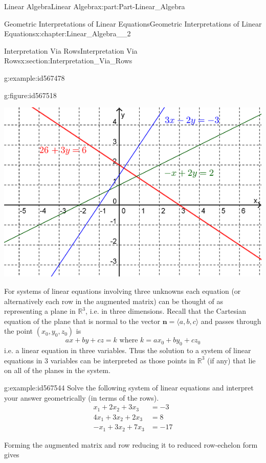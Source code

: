 \documentclass[oneside,10pt,]{book}
\numberwithin{equation}{section}
\newcommand{\amp}{&}
\begin{document}
\begin{partptx}{Linear Algebra}{}{Linear Algebra}{}{}{x:part:Part-Linear_Algebra}
\begin{chapterptx}{Geometric Interpretations of Linear Equations}{}{Geometric Interpretations of Linear Equations}{}{}{x:chapter:Linear_Algebra__2}
\begin{sectionptx}{Interpretation Via Rows}{}{Interpretation Via Rows}{}{}{x:section:Interpretation_Via_Rows}
\begin{example}{}{g:example:id567478}
\begin{figureptx}{}{g:figure:id567518}{}
\begin{image}{0.2}{0.6}{0.2}%
\includegraphics[width=\linewidth]{./LinearAlgebra/Images/2/figure1.png}
\end{image}%
\tcblower
\end{figureptx}%
%
\end{example}
For systems of linear equations involving three unknowns each equation (or alternatively each row in the augmented matrix) can be thought of as representing a plane in \(\mathbb{R}^3\), i.e. in three dimensions. Recall that the Cartesian equation of the plane that is normal to the vector \(\mathbf{n}=\langle a,b,c \rangle\) and passes through the point \((x_0,y_0,z_0)\) is%
\begin{equation*}
ax+by+cz=k \textrm{ where } k=ax_0+by_0+cz_0
\end{equation*}
i.e. a linear equation in three variables. Thus the solution to a system of linear equations in \(3\) variables can be interpreted as those points in \(\mathbb{R}^3\) (if any) that lie on all of the planes in the system.%
\begin{example}{}{g:example:id567544}%
Solve the following system of linear equations and interpret your answer geometrically (in terms of the rows).%
\begin{align*}
x_1+2x_2+3x_3 \amp =-3\\
4x_1+3x_2+2x_3 \amp=8\\
-x_1+3x_2+7x_3 \amp=-17
\end{align*}
%
\par\smallskip%
\noindent\hypertarget{g:solution:id567559}{}Forming the augmented matrix and row reducing it to reduced row-echelon form gives%
\begin{equation*}

\end{equation*}
\end{example}
\end{sectionptx}
\end{chapterptx}
\end{partptx}
\end{document}
